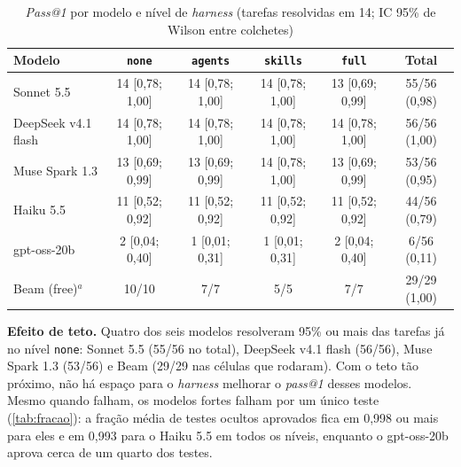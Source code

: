 \begin{table}[htb]
    \centering
    \ABNTEXfontereduzida
    \caption{\textit{Pass@1} por modelo e nível de \textit{harness} (tarefas resolvidas em 14; IC 95\% de Wilson entre colchetes)}
    \label{tab:pass1}
    \begin{tabular}{lccccc}
        \toprule
        \textbf{Modelo} & \texttt{none} & \texttt{agents} & \texttt{skills} & \texttt{full} & \textbf{Total} \\
        \midrule
        Sonnet 5.5 & 14 [0,78; 1,00] & 14 [0,78; 1,00] & 14 [0,78; 1,00] & 13 [0,69; 0,99] & 55/56 (0,98) \\
        DeepSeek v4.1 flash & 14 [0,78; 1,00] & 14 [0,78; 1,00] & 14 [0,78; 1,00] & 14 [0,78; 1,00] & 56/56 (1,00) \\
        Muse Spark 1.3 & 13 [0,69; 0,99] & 13 [0,69; 0,99] & 14 [0,78; 1,00] & 13 [0,69; 0,99] & 53/56 (0,95) \\
        Haiku 5.5 & 11 [0,52; 0,92] & 11 [0,52; 0,92] & 11 [0,52; 0,92] & 11 [0,52; 0,92] & 44/56 (0,79) \\
        gpt-oss-20b & 2 [0,04; 0,40] & 1 [0,01; 0,31] & 1 [0,01; 0,31] & 2 [0,04; 0,40] & 6/56 (0,11) \\
        Beam (free)$^{a}$ & 10/10 & 7/7 & 5/5 & 7/7 & 29/29 (1,00) \\
        \bottomrule
    \end{tabular}
\end{table}

\textbf{Efeito de teto.} Quatro dos seis modelos resolveram 95\% ou mais das
tarefas já no nível \texttt{none}: Sonnet 5.5 (55/56 no total), DeepSeek v4.1
flash (56/56), Muse Spark 1.3 (53/56) e Beam (29/29 nas células que rodaram).
Com o teto tão próximo, não há espaço para o \textit{harness} melhorar o
\textit{pass@1} desses modelos. Mesmo quando falham, os modelos fortes falham
por um único teste (\autoref{tab:fracao}): a fração média de testes ocultos
aprovados fica em 0,998 ou mais para eles e em 0,993 para o Haiku 5.5 em todos
os níveis, enquanto o gpt-oss-20b aprova cerca de um quarto dos testes.


